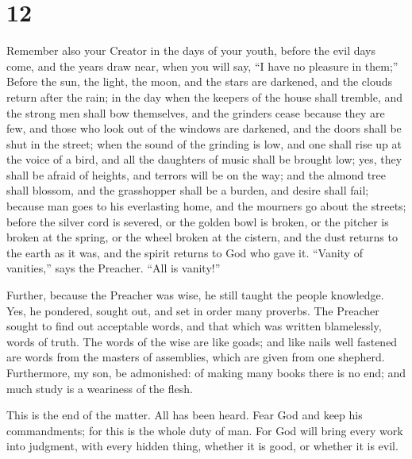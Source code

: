 \hypertarget{section-11}{%
\section{12}\label{section-11}}

 Remember also your Creator in the days of your youth,
before the evil days come, and the years draw near, when you will say,
``I have no pleasure in them;''  Before the sun, the
light, the moon, and the stars are darkened, and the clouds return after
the rain;  in the day when the keepers of the house shall
tremble, and the strong men shall bow themselves, and the grinders cease
because they are few, and those who look out of the windows are
darkened,  and the doors shall be shut in the street; when
the sound of the grinding is low, and one shall rise up at the voice of
a bird, and all the daughters of music shall be brought low;
 yes, they shall be afraid of heights, and terrors will be
on the way; and the almond tree shall blossom, and the grasshopper shall
be a burden, and desire shall fail; because man goes to his everlasting
home, and the mourners go about the streets;  before the
silver cord is severed, or the golden bowl is broken, or the pitcher is
broken at the spring, or the wheel broken at the cistern, 
and the dust returns to the earth as it was, and the spirit returns to
God who gave it.  ``Vanity of vanities,'' says the
Preacher. ``All is vanity!''

 Further, because the Preacher was wise, he still taught
the people knowledge. Yes, he pondered, sought out, and set in order
many proverbs.  The Preacher sought to find out
acceptable words, and that which was written blamelessly, words of
truth.  The words of the wise are like goads; and like
nails well fastened are words from the masters of assemblies, which are
given from one shepherd.  Furthermore, my son, be
admonished: of making many books there is no end; and much study is a
weariness of the flesh.

 This is the end of the matter. All has been heard. Fear
God and keep his commandments; for this is the whole duty of man.
 For God will bring every work into judgment, with every
hidden thing, whether it is good, or whether it is evil.
